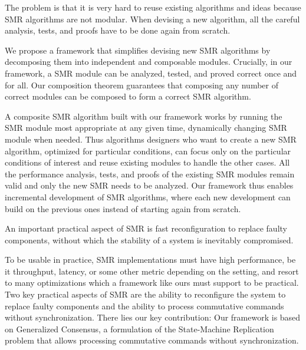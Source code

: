The problem is that it is very hard to reuse existing algorithms and ideas because SMR algorithms are not modular. When devising a new algorithm, all the careful analysis, tests, and proofs have to be done again from scratch.

We propose a framework that simplifies devising new SMR algorithms by decomposing them into independent and composable modules.
Crucially, in our framework, a SMR module can be analyzed, tested, and proved correct  once and for all. 
Our composition theorem guarantees that composing any number of correct modules can be composed to form a correct SMR algorithm. 

A composite SMR algorithm built with our framework works by running the SMR module most appropriate at any given time, dynamically changing SMR module when needed.
Thus algorithms designers who want to create a new SMR algorithm, optimized for particular conditions, can focus only on the particular conditions of interest and reuse existing modules to handle the other cases. All the performance analysis, tests, and proofs of the existing SMR modules remain valid and only the new SMR needs to be analyzed.
Our framework thus enables incremental development of SMR algorithms, where each new development can build on the previous ones instead of starting again from scratch.

An important practical aspect of SMR is fast reconfiguration to replace faulty components, without which the stability of a system is inevitably compromised.

To be usable in  practice, SMR implementations must have high performance, be it throughput, latency, or some other metric depending on the setting, and resort to many optimizations which a framework like ours must support to be practical.
Two key practical aspects of SMR are the ability to reconfigure the system to replace faulty components and the ability to process commutative commands without synchronization.
There lies our key contribution: 
Our framework is based on Generalized Consensus, a formulation of the State-Machine Replication problem that allows processing commutative commands without synchronization.

